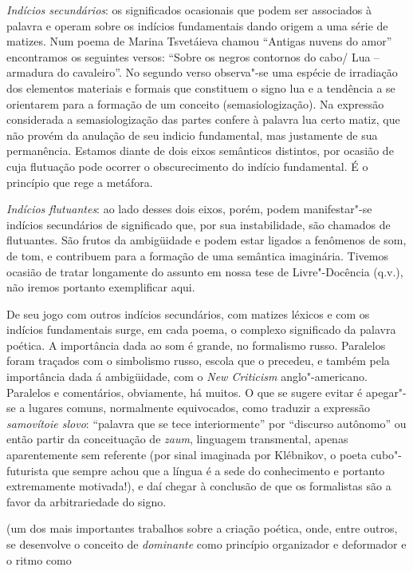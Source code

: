 {  \emph{Indícios secundários}: os significados ocasionais que podem ser
  associados à palavra e operam sobre os indícios fundamentais dando
  origem a uma série de matizes. Num poema de Marina Tsvetáieva chamou
  ``Antigas nuvens do amor'' encontramos os seguintes versos: ``Sobre os
  negros contornos do cabo/ Lua -- armadura do cavaleiro''. No segundo
  verso observa"-se uma espécie de irradiação dos elementos materiais e
  formais que constituem o signo lua e a tendência a se orientarem para
  a formação de um conceito (semasiologização). Na expressão considerada
  a semasiologização das partes confere à palavra lua certo matiz, que
  não provém da anulação de seu indicio fundamental, mas justamente de
  sua permanência. Estamos diante de dois eixos semânticos distintos,
  por ocasião de cuja flutuação pode ocorrer o obscurecimento do indício
  fundamental. É o princípio que rege a metáfora.

  \emph{Indícios flutuantes}: ao lado desses dois eixos, porém, podem
  manifestar"-se indícios secundários de significado que, por sua
  instabilidade, são chamados de flutuantes. São frutos da ambigüidade e
  podem estar ligados a fenômenos de som, de tom, e contribuem para a
  formação de uma semântica imaginária. Tivemos ocasião de tratar
  longamente do assunto em nossa tese de Livre"-Docência (q.v.), não
  iremos portanto exemplificar aqui.

  De seu jogo com outros indícios secundários, com matizes léxicos e com
  os indícios fundamentais surge, em cada poema, o complexo significado
  da palavra poética. A importância dada ao som é grande, no formalismo
  russo. Paralelos foram traçados com o simbolismo russo, escola que o
  precedeu, e também pela importância dada á ambigüidade, com o
  \emph{New Criticism} anglo"-americano. Paralelos e comentários,
  obviamente, há muitos. O que se sugere evitar é apegar"-se a lugares
  comuns, normalmente equivocados, como traduzir a expressão
  \emph{samovítoie slovo}: ``palavra que se tece interiormente'' por
  ``discurso autônomo'' ou então partir da conceituação de \emph{zaum},
  linguagem transmental, apenas aparentemente sem referente (por sinal
  imaginada por Klébnikov, o poeta cubo"-futurista que sempre achou que a
  língua é a sede do conhecimento e portanto extremamente motivada!), e
  daí chegar à conclusão de que os formalistas são a favor da
  arbitrariedade do signo.} (um dos mais importantes trabalhos sobre a
criação poética, onde, entre outros, se desenvolve o conceito de
\emph{dominante} como princípio organizador e deformador e o ritmo como
